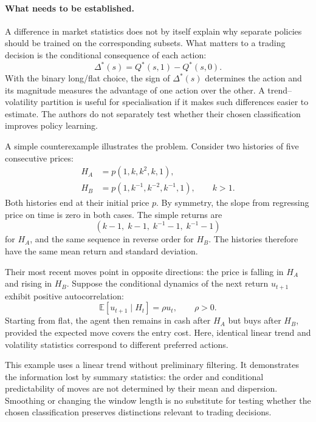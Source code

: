 \documentclass[9pt,a4paper,twocolumn]{extarticle}
\newcommand{\Exp}{\mathbb{E}}
\begin{document}
\paragraph{What needs to be established.}

A difference in market statistics does not by itself explain why separate policies should be
trained on the corresponding subsets. What matters to a trading decision is the conditional
consequence of each action:
\begin{equation}
  \Delta^*(s)
  =
  Q^*(s,1)-Q^*(s,0).
  \label{eq:optimal_action_difference}
\end{equation}
With the binary long/flat choice, the sign of $\Delta^*(s)$ determines the action and its
magnitude measures the advantage of one action over the other. A trend--volatility partition is
useful for specialisation if it makes such differences easier to estimate. The authors do not
separately test whether their chosen classification improves policy learning.

A simple counterexample illustrates the problem. Consider two histories of five consecutive
prices:
\begin{equation}
\begin{aligned}
  H_A &= p(1,k,k^2,k,1),\\
  H_B &= p(1,k^{-1},k^{-2},k^{-1},1),
  \qquad k>1.
\end{aligned}
\label{eq:matched_histories}
\end{equation}
Both histories end at their initial price $p$. By symmetry, the slope from regressing price on
time is zero in both cases. The simple returns are
\[
  (k-1,\;k-1,\;k^{-1}-1,\;k^{-1}-1)
\]
for $H_A$, and the same sequence in reverse order for $H_B$. The histories therefore have the
same mean return and standard deviation.

Their most recent moves point in opposite directions: the price is falling in $H_A$ and rising
in $H_B$. Suppose the conditional dynamics of the next return $u_{t+1}$ exhibit positive
autocorrelation:
\begin{equation}
  \Exp[u_{t+1}\mid H_t]=\rho u_t,
  \qquad \rho>0.
  \label{eq:momentum_counterexample}
\end{equation}
Starting from flat, the agent then remains in cash after $H_A$ but buys after $H_B$, provided the
expected move covers the entry cost. Here, identical linear trend and volatility statistics
correspond to different preferred actions.

This example uses a linear trend without preliminary filtering. It demonstrates the information
lost by summary statistics: the order and conditional predictability of moves are not determined
by their mean and dispersion. Smoothing or changing the window length is no substitute for
testing whether the chosen classification preserves distinctions relevant to trading decisions.
\end{document}
